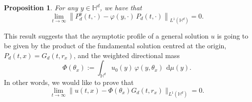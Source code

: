 \documentclass[12pt,longbibliography]{article}
\newcommand{\abs}[1]{\left\vert#1\right\vert}
\newcommand{\norm}[1]{\left\Vert#1\right\Vert}
\def\d{\,\mathrm{d}}
\def\d{\,\mathrm{d}}
\def\H{\mathbb{H}}
\newtheorem{prp}[thm]{Proposition}
\theoremstyle{definition}
\theoremstyle{remark}
\theoremstyle{example}
\begin{document}
\begin{prp}\label{prp:convergence_kernels_varphi}
	For any $y \in \mathbb{H}^d$, we have that 
	\[
		\lim_{t \to \infty} \left\| P_d^y(t,\cdot) - \varphi(y, \cdot) \, P_d(t,\cdot) \right\|_{L^1(\mathbb{H}^d)} = 0.
	\]
\end{prp}
This result suggests that the asymptotic profile of a general solution $u$ is going to be given by the product of the fundamental solution centred at the origin, $P_d(t,x)=G_d(t,r_x)$, and the weighted directional mass
\begin{equation}\label{eq:def_Phi}
\Phi(\theta_x):= \int_{\H^d} u_0(y)\, \varphi(y,\theta_x)\ \d\mu(y).
\end{equation}
In other words, we would like to prove that
\[
\lim\limits_{t\to\infty}\|u(t,x)-\Phi(\theta_x)G_d(t,r_x)\|_{L^1(\H^d)}=0.
\]
\end{document}

